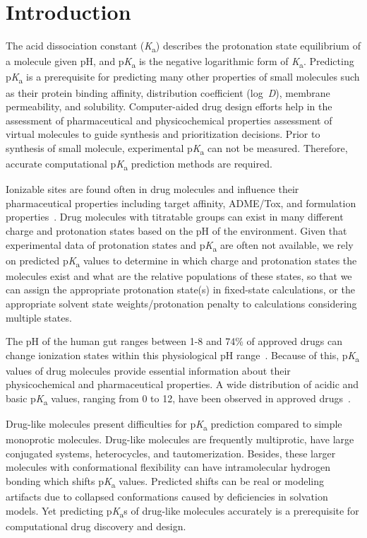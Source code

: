\documentclass[9pt,lineno,final]{elife}
\newcommand{\pKa}{p\textit{K}\textsubscript{a}}
\newcommand{\logD}{log~\textit{D}}
\begin{document}
\section{Introduction}

The acid dissociation constant (\textit{K}\textsubscript{a}) describes the protonation state equilibrium of a molecule given pH, and \pKa{} is the negative logarithmic form of \textit{K}\textsubscript{a}. 
Predicting \pKa{} is a prerequisite for predicting many other properties of small molecules such as their protein binding affinity, distribution coefficient (\logD{}), membrane permeability, and solubility. Computer-aided drug design efforts help in the assessment of pharmaceutical and physicochemical properties assessment of virtual molecules to guide synthesis and prioritization decisions. 
Prior to synthesis of small molecule, experimental \pKa{} can not be measured. Therefore, accurate computational \pKa{} prediction methods are required.


Ionizable sites are found often in drug molecules and influence their pharmaceutical properties including target affinity, ADME/Tox, and formulation properties~\citep{Manallack:2013:ChemSocRev}. 
Drug molecules with titratable groups can exist in many different charge and protonation states based on the pH of the environment. 
Given that experimental data of protonation states and \pKa{} are often not available, we rely on predicted \pKa{} values to determine in which charge and protonation states the molecules exist and what are the relative populations of these states, so that we can assign the appropriate protonation state(s) in fixed-state calculations, or the appropriate solvent state weights/protonation penalty to calculations considering multiple states.

The pH of the human gut ranges between 1-8 and 74\% of approved drugs can change ionization states within this physiological pH range~\citep{Manallack:2013:ChemMedChema}. Because of this, \pKa{} values of drug molecules provide essential information about their physicochemical and pharmaceutical properties. 
A wide distribution of acidic and basic \pKa{} values, ranging from 0 to 12, have been observed in approved drugs~\citep{Manallack:2013:ChemMedChema, Manallack:2013:ChemSocRev}.


Drug-like molecules present difficulties for \pKa{} prediction compared to simple monoprotic molecules. 
Drug-like molecules are frequently multiprotic, have large conjugated systems, heterocycles, and tautomerization. Besides, these larger molecules with conformational flexibility can have intramolecular hydrogen bonding which shifts \pKa{} values. Predicted shifts can be real or modeling artifacts due to collapsed conformations caused by deficiencies in solvation models. Yet predicting \pKa{}s of drug-like molecules accurately is a prerequisite for computational drug discovery and design.
\end{document}
